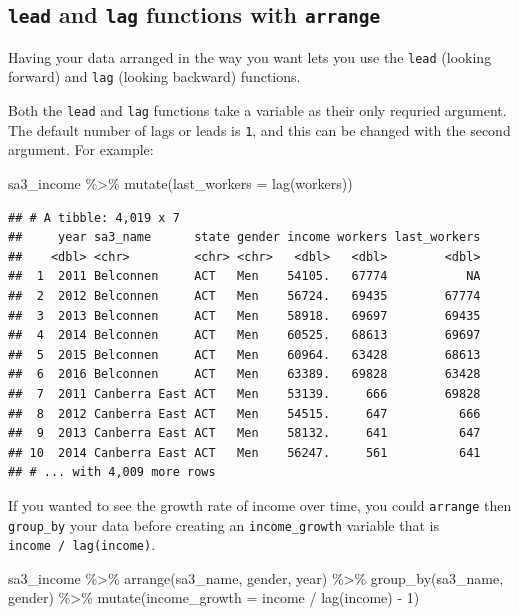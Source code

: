 \documentclass[
]{book}
\newenvironment{Shaded}{\begin{snugshade}}{\end{snugshade}}
\newcommand{\AttributeTok}[1]{\textcolor[rgb]{0.77,0.63,0.00}{#1}}
\newcommand{\DecValTok}[1]{\textcolor[rgb]{0.00,0.00,0.81}{#1}}
\newcommand{\FunctionTok}[1]{\textcolor[rgb]{0.00,0.00,0.00}{#1}}
\newcommand{\NormalTok}[1]{#1}
\newcommand{\SpecialCharTok}[1]{\textcolor[rgb]{0.00,0.00,0.00}{#1}}
\begin{document}
\hypertarget{lead-and-lag-functions-with-arrange}{%
\subsection{\texorpdfstring{\texttt{lead} and \texttt{lag} functions with \texttt{arrange}}{lead and lag functions with arrange}}\label{lead-and-lag-functions-with-arrange}}

Having your data arranged in the way you want lets you use the \texttt{lead} (looking forward) and \texttt{lag} (looking backward) functions.

Both the \texttt{lead} and \texttt{lag} functions take a variable as their only requried argument. The default number of lags or leads is \texttt{1}, and this can be changed with the second argument. For example:

\begin{Shaded}
\begin{Highlighting}[]
\NormalTok{sa3\_income }\SpecialCharTok{\%\textgreater{}\%}
  \FunctionTok{mutate}\NormalTok{(}\AttributeTok{last\_workers =} \FunctionTok{lag}\NormalTok{(workers))}
\end{Highlighting}
\end{Shaded}

\begin{verbatim}
## # A tibble: 4,019 x 7
##     year sa3_name      state gender income workers last_workers
##    <dbl> <chr>         <chr> <chr>   <dbl>   <dbl>        <dbl>
##  1  2011 Belconnen     ACT   Men    54105.   67774           NA
##  2  2012 Belconnen     ACT   Men    56724.   69435        67774
##  3  2013 Belconnen     ACT   Men    58918.   69697        69435
##  4  2014 Belconnen     ACT   Men    60525.   68613        69697
##  5  2015 Belconnen     ACT   Men    60964.   63428        68613
##  6  2016 Belconnen     ACT   Men    63389.   69828        63428
##  7  2011 Canberra East ACT   Men    53139.     666        69828
##  8  2012 Canberra East ACT   Men    54515.     647          666
##  9  2013 Canberra East ACT   Men    58132.     641          647
## 10  2014 Canberra East ACT   Men    56247.     561          641
## # ... with 4,009 more rows
\end{verbatim}

If you wanted to see the growth rate of income over time, you could \texttt{arrange} then \texttt{group\_by} your data before creating an \texttt{income\_growth} variable that is \texttt{income\ /\ lag(income)}.

\begin{Shaded}
\begin{Highlighting}[]
\NormalTok{sa3\_income }\SpecialCharTok{\%\textgreater{}\%}
  \FunctionTok{arrange}\NormalTok{(sa3\_name, gender, year) }\SpecialCharTok{\%\textgreater{}\%} 
  \FunctionTok{group\_by}\NormalTok{(sa3\_name, gender) }\SpecialCharTok{\%\textgreater{}\%} 
  \FunctionTok{mutate}\NormalTok{(}\AttributeTok{income\_growth =}\NormalTok{ income }\SpecialCharTok{/} \FunctionTok{lag}\NormalTok{(income) }\SpecialCharTok{{-}} \DecValTok{1}\NormalTok{)}
\end{Highlighting}
\end{Shaded}
\end{document}
